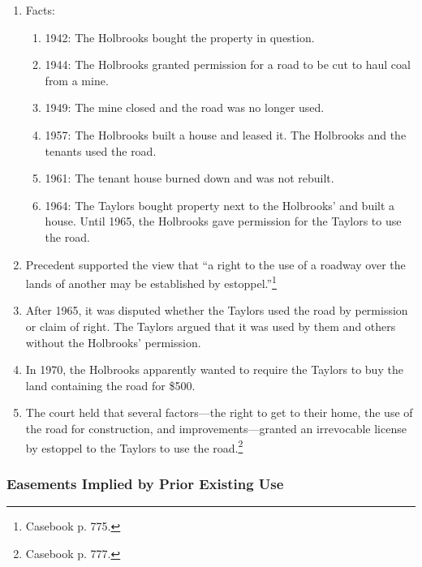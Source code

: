 \begin{enumerate}
    \item Facts:
    \begin{enumerate}
        \item 1942: The Holbrooks bought the property in question.
        \item 1944: The Holbrooks granted permission for a road to be cut to 
        haul coal from a mine.
        \item 1949: The mine closed and the road was no longer used.
        \item 1957: The Holbrooks built a house and leased it. The Holbrooks 
        and the tenants used the road.
        \item 1961: The tenant house burned down and was not rebuilt.
        \item 1964: The Taylors bought property next to the Holbrooks' and 
        built a house. Until 1965, the Holbrooks gave permission for the 
        Taylors to use the road.
    \end{enumerate}
    \item Precedent supported the view that ``a right to the use of a roadway 
    over the lands of another may be established by 
    estoppel.''\footnote{Casebook p. 775.}
    \item After 1965, it was disputed whether the Taylors used the road by 
    permission or claim of right. The Taylors argued that it was used by them 
    and others without the Holbrooks' permission.
    \item In 1970, the Holbrooks apparently wanted to require the Taylors to 
    buy the land containing the road for \$500.
    \item The court held that several factors---the right to get to their 
    home, the use of the road for construction, and improvements---granted an 
    irrevocable license by estoppel to the Taylors to use the 
    road.\footnote{Casebook p. 777.}
\end{enumerate}


\subsubsection{Easements Implied by Prior Existing Use}

